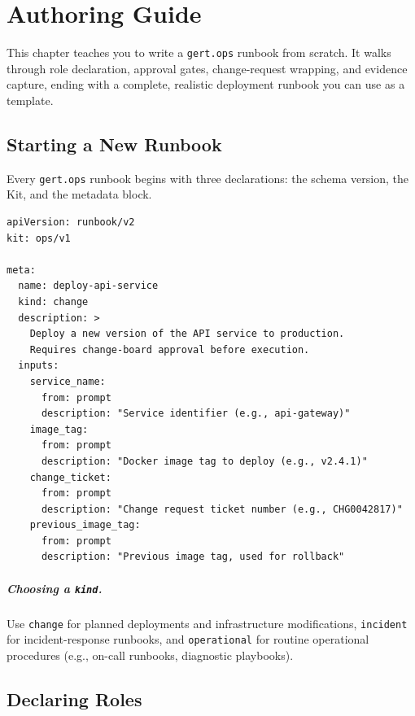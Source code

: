 \chapter{Authoring Guide}
\label{ch:authoring-guide}

This chapter teaches you to write a \texttt{gert.ops} runbook from scratch. It walks through
role declaration, approval gates, change-request wrapping, and evidence capture, ending with
a complete, realistic deployment runbook you can use as a template.

\section{Starting a New Runbook}
\label{sec:authoring-start}

Every \texttt{gert.ops} runbook begins with three declarations: the schema version, the Kit,
and the metadata block.

\begin{verbatim}
apiVersion: runbook/v2
kit: ops/v1

meta:
  name: deploy-api-service
  kind: change
  description: >
    Deploy a new version of the API service to production.
    Requires change-board approval before execution.
  inputs:
    service_name:
      from: prompt
      description: "Service identifier (e.g., api-gateway)"
    image_tag:
      from: prompt
      description: "Docker image tag to deploy (e.g., v2.4.1)"
    change_ticket:
      from: prompt
      description: "Change request ticket number (e.g., CHG0042817)"
    previous_image_tag:
      from: prompt
      description: "Previous image tag, used for rollback"
\end{verbatim}

\paragraph{Choosing a \texttt{kind}.}
Use \texttt{change} for planned deployments and infrastructure modifications, \texttt{incident}
for incident-response runbooks, and \texttt{operational} for routine operational procedures
(e.g., on-call runbooks, diagnostic playbooks).

\section{Declaring Roles}
\label{sec:authoring-roles}

